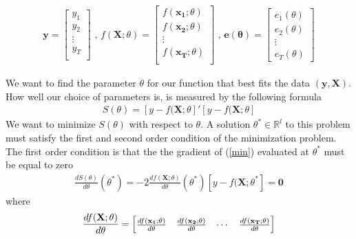 \documentclass{article}
\begin{document}
\begin{eqnarray}
\textbf{y} = 
\begin{bmatrix}
y_1 \\ y_2 \\ \vdots \\ y _T \\ 
\end{bmatrix} \text{  ,  } 
f(\mathbf{X}; \theta) = 
\begin{bmatrix} 
f(\mathbf{x_1};\theta) \\
f(\mathbf{x_2};\theta) \\
\vdots \\
f(\mathbf{x_T};\theta) \\
\end{bmatrix} \text{  ,  }
\mathbf{e(\theta)} = 
\begin{bmatrix}
e_1(\theta) \\ e_2(\theta) \\ \vdots \\ e_T(\theta)
\end{bmatrix} 
\end{eqnarray}

We want to find the parameter $\theta$ for our function that best fits the data $(\mathbf{y,X})$. How well our choice of parameters is, is measured by the following formula
\begin{eqnarray}
 S(\theta) = [y - f(\mathbf{X};\theta]'[y - f(\mathbf{X};\theta]  \label{min}
\end{eqnarray}
We want to minimize $S(\theta)$ with respect to $\theta$. A solution $\theta^* \in \mathbb{R}^l$ to this problem must satisfy the first and second order condition of the minimization problem. The first order condition is that the the gradient of (\ref{min}) evaluated at $\theta^*$ must be equal to zero
\begin{eqnarray} 
\frac{dS(\theta)}{d\theta}(\theta^*) = -2 \frac{df(\mathbf{X};\theta)}{d\theta}(\theta^*) [y - f(\mathbf{X};\theta^*]
=  \mathbf{0} \label{foc}
\end{eqnarray}
where 
\begin{eqnarray}
\frac{df(\mathbf{X};\theta)}{d\theta}= 
\begin{bmatrix}
\frac{df(\mathbf{x_1};\theta)}{d\theta} & \frac{df(\mathbf{x_2};\theta)}{d\theta} & \cdots & \frac{df(\mathbf{x_T};\theta)}{d\theta}  \\
\end{bmatrix}
\notag
\end{eqnarray}
\end{document}
